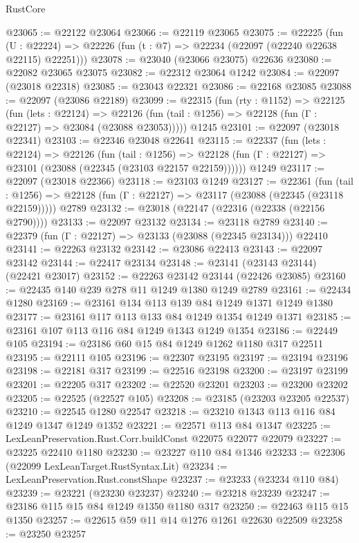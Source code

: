 \begin{lexlean}{RustCore}
\begin{coremodule}
@23065 := @22122 @23064
@23066 := @22119 @23065
@23075 := @22225
    (fun (U : @22224) => @22226 (fun (t : @7) => @22234 (@22097 (@22240 @22638 @22115) @22251)))
@23078 := @23040 (@23066 @23075) @22636
@23080 := @22082 @23065 @23075
@23082 := @22312 @23064 @1242
@23084 := @22097 (@23018 @22318)
@23085 := @23043 @22321
@23086 := @22168 @23085
@23088 := @22097 (@23086 @22189)
@23099 := @22315
    (fun (rty : @1152) =>
    @22125
      (fun (lets : @22124) =>
      @22126 (fun (tail : @1256) => @22128 (fun (Γ : @22127) => @23084 (@23088 @23053)))))
    @1245
@23101 := @22097 (@23018 @22341)
@23103 := @22346 @23048 @22641
@23115 := @22337
    (fun (lets : @22124) =>
    @22126
      (fun (tail : @1256) =>
      @22128 (fun (Γ : @22127) => @23101 (@23088 (@22345 (@23103 @22157 @22159))))))
    @1249
@23117 := @22097 (@23018 @22366)
@23118 := @23103 @1249
@23127 := @22361
    (fun (tail : @1256) => @22128 (fun (Γ : @22127) => @23117 (@23088 (@22345 (@23118 @22159)))))
    @2789
@23132 := @23018 (@22147 (@22316 (@22338 (@22156 @2790))))
@23133 := @22097 @23132
@23134 := @23118 @2789
@23140 := @22379 (fun (Γ : @22127) => @23133 (@23088 (@22345 @23134))) @22410
@23141 := @22263 @23132
@23142 := @23086 @22413
@23143 := @22097 @23142
@23144 := @22417 @23134
@23148 := @23141 (@23143 @23144) (@22421 @23017)
@23152 := @22263 @23142 @23144 (@22426 @23085)
@23160 := @22435 @140 @239 @278 @11 @1249 @1380 @1249 @2789
@23161 := @22434 @1280
@23169 := @23161 @134 @113 @139 @84 @1249 @1371 @1249 @1380
@23177 := @23161 @117 @113 @133 @84 @1249 @1354 @1249 @1371
@23185 := @23161 @107 @113 @116 @84 @1249 @1343 @1249 @1354
@23186 := @22449 @105
@23194 := @23186 @60 @15 @84 @1249 @1262 @1180 @317 @22511
@23195 := @22111 @105
@23196 := @22307 @23195
@23197 := @23194 @23196
@23198 := @22181 @317
@23199 := @22516 @23198
@23200 := @23197 @23199
@23201 := @22205 @317
@23202 := @22520 @23201
@23203 := @23200 @23202
@23205 := @22525 (@22527 @105)
@23208 := @23185 (@23203 @23205 @22537)
@23210 := @22545 @1280 @22547
@23218 := @23210 @1343 @113 @116 @84 @1249 @1347 @1249 @1352
@23221 := @22571 @113 @84 @1347
@23225 := LexLeanPreservation.Rust.Corr.buildConst @22075 @22077 @22079
@23227 := @23225 @22410 @1180
@23230 := @23227 @110 @84 @1346
@23233 := @22306 (@22099 LexLeanTarget.RustSyntax.Lit)
@23234 := LexLeanPreservation.Rust.constShape
@23237 := @23233 (@23234 @110 @84)
@23239 := @23221 (@23230 @23237)
@23240 := @23218 @23239
@23247 := @23186 @115 @15 @84 @1249 @1350 @1180 @317
@23250 := @22463 @115 @15 @1350
@23257 := @22615 @59 @11 @14 @1276 @1261 @22630 @22509
@23258 := @23250 @23257

\end{coremodule}
\end{lexlean}
